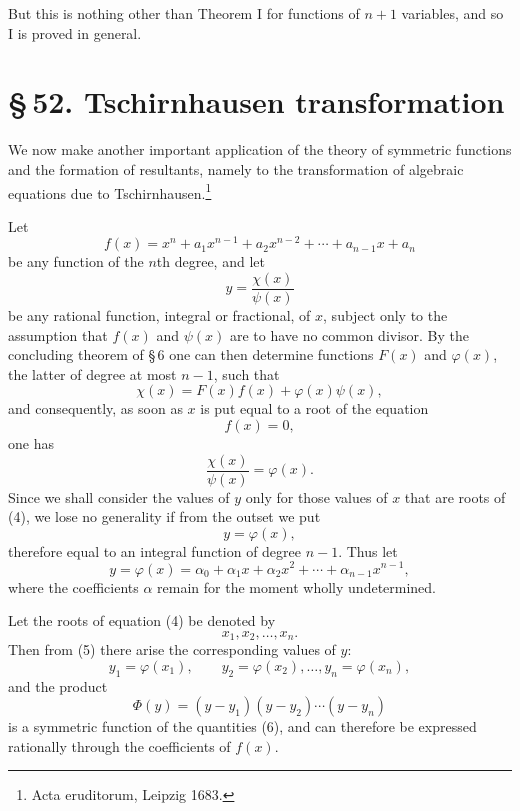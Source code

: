 \documentclass[11pt]{article}
\providecommand{\sect}[2]{\section*{\S\,#1. #2}}
\begin{document}
But this is nothing other than Theorem I for functions of $n+1$ variables, and so I is proved in general.

\sect{52}{Tschirnhausen transformation}

We now make another important application of the theory of symmetric functions and the formation of resultants, namely to the transformation of algebraic equations due to Tschirnhausen.\footnote{Acta eruditorum, Leipzig 1683.}

Let
\begin{equation}
f(x)=x^n+a_1x^{n-1}+a_2x^{n-2}+\cdots+a_{n-1}x+a_n
\tag{1}
\end{equation}
be any function of the $n$th degree, and let
\begin{equation}
y=\frac{\chi(x)}{\psi(x)}
\tag{2}
\end{equation}
be any rational function, integral or fractional, of $x$, subject only to the assumption that $f(x)$ and $\psi(x)$ are to have no common divisor. By the concluding theorem of \S\,6 one can then determine functions $F(x)$ and $\varphi(x)$, the latter of degree at most $n-1$, such that
\begin{equation}
\chi(x)=F(x)f(x)+\varphi(x)\psi(x),
\tag{3}
\end{equation}
and consequently, as soon as $x$ is put equal to a root of the equation
\begin{equation}
f(x)=0,
\tag{4}
\end{equation}
one has
\[
\frac{\chi(x)}{\psi(x)}=\varphi(x).
\]
Since we shall consider the values of $y$ only for those values of $x$ that are roots of (4), we lose no generality if from the outset we put
\[
y=\varphi(x),
\]
therefore equal to an integral function of degree $n-1$. Thus let
\begin{equation}
y=\varphi(x)=\alpha_0+\alpha_1x+\alpha_2x^2+\cdots+\alpha_{n-1}x^{n-1},
\tag{5}
\end{equation}
where the coefficients $\alpha$ remain for the moment wholly undetermined.

Let the roots of equation (4) be denoted by
\begin{equation}
x_1,x_2,\ldots,x_n.
\tag{6}
\end{equation}
Then from (5) there arise the corresponding values of $y$:
\begin{equation}
y_1=\varphi(x_1),\qquad y_2=\varphi(x_2),\ldots, y_n=\varphi(x_n),
\tag{7}
\end{equation}
and the product
\begin{equation}
\Phi(y)=(y-y_1)(y-y_2)\cdots(y-y_n)
\tag{8}
\end{equation}
is a symmetric function of the quantities (6), and can therefore be expressed rationally through the coefficients of $f(x)$.
\end{document}
